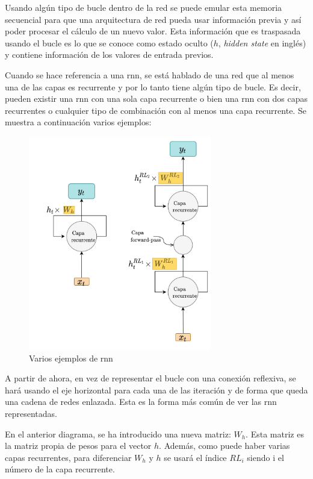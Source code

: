 Usando algún tipo de bucle dentro de la red se puede emular esta memoria secuencial para que una arquitectura de red pueda usar información previa y así poder procesar el cálculo de un nuevo valor. Esta información que es traspasada usando el bucle es lo que se conoce como estado oculto ($h$, \textit{hidden state} en inglés) y contiene información de los valores de entrada previos.
\newline

Cuando se hace referencia a una \acrshort{rnn}, se está hablado de una red que al menos una de las capas es recurrente y por lo tanto tiene algún tipo de bucle. Es decir, pueden existir una \acrshort{rnn} con una sola capa recurrente o bien una \acrshort{rnn} con dos capas recurrentes o cualquier tipo de combinación con al menos una capa recurrente. Se muestra a continuación varios ejemplos:
\begin{figure}[H]
    \centering
    \includegraphics[width=8cm]{images/state-of-art/rnn/rnn-compact.png}
    \caption{Varios ejemplos de \acrshort{rnn}}
    \label{fig:rnn-compact}
\end{figure}

A partir de ahora, en vez de representar el bucle con una conexión reflexiva, se hará usando el eje horizontal para cada una de las iteración y de forma que queda una cadena de redes enlazada. Esta es la forma más común de ver las \acrshort{rnn} representadas.
\newline

En el anterior diagrama, se ha introducido una nueva matriz: $W_h$. Esta matriz es la matriz propia de pesos para el vector $h$. Además, como puede haber varias capas recurrentes, para diferenciar $W_h$ y $h$ se usará el índice $RL_i$ siendo i el número de la capa recurrente.